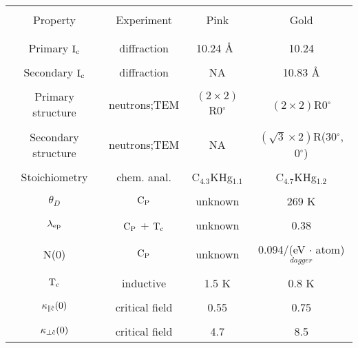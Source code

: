 \setcounter{chapter}{4}
{\newpage
\clearpage
\samepage \begin{table}%
\begin{center}

\label{pink-gold}
\begin{tabular}{||c|c|c|c||}
\hline
& & & \\  Property & Experiment & Pink & Gold \\  & & & \\ 
\hline
& & & \\ 
Primary $\rm I_c$ &  diffraction\cite{kamitakahara84,lagrange83}& 10.24 \AA\ & 10.24 \\ 
& & & \\ 
Secondary $\rm I_c$ & diffraction\cite{kamitakahara84,lagrange83}& NA  &10.83 \AA \\ 
& & & \\ 
Primary structure & neutrons\cite{kamitakahara84};TEM\cite{J140} & $(2 \times 2)$R0$^{\circ}$ &  $(2 \times 2)$R0$^{\circ}$  \\ 
& & & \\ 
Secondary  structure & neutrons\cite{kamitakahara84};TEM\cite{J140} &NA & $(\sqrt{3} \times 2)$R(30$^{\circ}$, 0$^{\circ}$) \\ 
& & & \\ 
Stoichiometry & chem. anal. & C$_{4.3}$KHg$_{1.1}$ & C$_{4.7}$KHg$_{1.2}$ \\ 
& & & \\ 
$\theta_D$ & $\rm C_P$\cite{alexander81} & unknown & 269 K\cite{alexander81} \\ 
& & & \\ 
$\rm \lambda_{ep}$ & $\rm C_P$\cite{alexander81} + $\rm T_c$ &  unknown & 0.38\cite{iye82} \\ 
& & & \\ 
N(0) & $\rm C_P$\cite{alexander81} & unknown & 0.094/(eV $\cdot$ atom)$^{dagger}$\\ 
& & & \\ 
$\rm T_c$ & inductive & 1.5 K & 0.8 K \\ 
& & & \\ 
$\rm \kappa_{\parallel\hat{c}}(0)$ & critical field  & 0.55 & 0.75 \\ 
& & & \\ 
$\rm \kappa_{\perp\hat{c}}(0)$& critical field  & 4.7 & 8.5 \\ 
\hline
\end{tabular}
\end{center}
\end{table}
}

